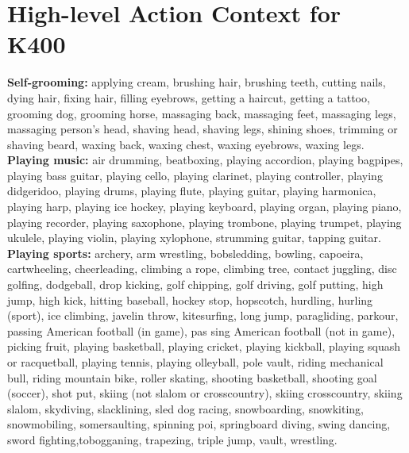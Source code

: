 \documentclass{article} \usepackage{iclr2024_conference,times}
\begin{document}
\section{High-level Action Context for K400}
\label{High-level Action Context for K400}
\selectfont

\textbf{Self-grooming:} applying cream, brushing hair, brushing teeth, cutting nails, dying hair, fixing hair, filling eyebrows, getting a haircut, getting a tattoo, grooming dog, grooming horse, massaging back, massaging feet, massaging legs, massaging person's head, shaving head, shaving legs, shining shoes, trimming or shaving beard, waxing back, waxing chest, waxing eyebrows, waxing legs. \\
\textbf{Playing music:} air drumming, beatboxing, playing accordion, playing bagpipes, playing bass guitar, playing cello, playing clarinet, playing controller, playing didgeridoo, playing drums, playing flute, playing guitar, playing harmonica, playing harp, playing ice hockey, playing keyboard, playing organ, playing piano, playing recorder, playing saxophone, playing trombone, playing trumpet, playing ukulele, playing violin,  playing xylophone, strumming guitar, tapping guitar.\\
\textbf{Playing sports:} archery, arm wrestling, bobsledding, bowling, capoeira, cartwheeling, cheerleading, climbing a rope, climbing tree, contact juggling, disc golfing, dodgeball, drop kicking, golf chipping, golf driving, golf putting, high jump, high kick, hitting baseball, hockey stop, hopscotch, hurdling, hurling (sport), ice climbing, javelin throw, kitesurfing, long jump, paragliding, parkour, passing American football (in game), pas sing American football (not in game), picking fruit, playing basketball, playing cricket, playing kickball, playing squash or racquetball, playing tennis, playing olleyball, pole vault, riding mechanical bull, riding mountain bike, roller skating, shooting basketball, shooting goal (soccer), shot put, skiing (not slalom or crosscountry), skiing crosscountry, skiing slalom, skydiving, slacklining, sled dog racing, snowboarding, snowkiting, snowmobiling, somersaulting, spinning poi, springboard diving, swing dancing, sword fighting,tobogganing, trapezing, triple jump, vault, wrestling.\\
\end{document}
